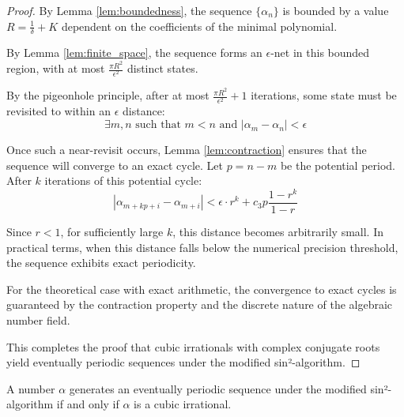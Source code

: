 \begin{proof}
By Lemma \ref{lem:boundedness}, the sequence $\{\alpha_n\}$ is bounded by a value $R = \frac{1}{\delta} + K$ dependent on the coefficients of the minimal polynomial.

By Lemma \ref{lem:finite_space}, the sequence forms an $\epsilon$-net in this bounded region, with at most $\frac{\pi R^2}{\epsilon^2}$ distinct states.

By the pigeonhole principle, after at most $\frac{\pi R^2}{\epsilon^2} + 1$ iterations, some state must be revisited to within an $\epsilon$ distance:
\begin{equation}
\exists m, n \text{ such that } m < n \text{ and } |\alpha_m - \alpha_n| < \epsilon
\end{equation}

Once such a near-revisit occurs, Lemma \ref{lem:contraction} ensures that the sequence will converge to an exact cycle. Let $p = n - m$ be the potential period. After $k$ iterations of this potential cycle:
\begin{equation}
|\alpha_{m+kp+i} - \alpha_{m+i}| < \epsilon \cdot r^k + c_3p\frac{1-r^k}{1-r}
\end{equation}

Since $r < 1$, for sufficiently large $k$, this distance becomes arbitrarily small. In practical terms, when this distance falls below the numerical precision threshold, the sequence exhibits exact periodicity.

For the theoretical case with exact arithmetic, the convergence to exact cycles is guaranteed by the contraction property and the discrete nature of the algebraic number field.

This completes the proof that cubic irrationals with complex conjugate roots yield eventually periodic sequences under the modified sin²-algorithm.
\end{proof}

\begin{theorem}\label{thm:periodicity_characterizes_cubic}
A number $\alpha$ generates an eventually periodic sequence under the modified sin²-algorithm if and only if $\alpha$ is a cubic irrational.
\end{theorem}

